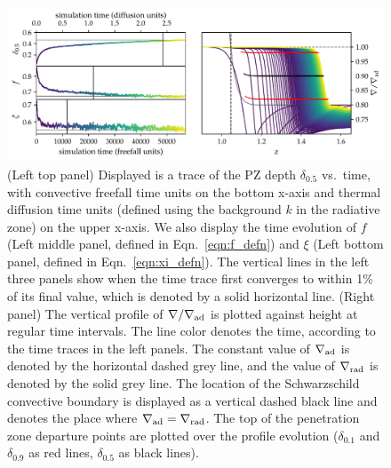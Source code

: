 \documentclass[twocolumn]{aastex631}
\newcommand{\gradrad}{\ensuremath{\nabla_{\rm{rad}}}}
\newcommand{\gradad}{\ensuremath{\nabla_{\rm{ad}}}}
\newcommand{\justgrad}{\ensuremath{\nabla}}
\begin{document}
\begin{figure}[t!]
\centering
\includegraphics[width=\textwidth]{time_evolution.pdf}
\caption{
(Left top panel) Displayed is a trace of the PZ depth $\delta_{0.5}$ vs.~time, with convective freefall time units on the bottom x-axis and thermal diffusion time units (defined using the background $k$ in the radiative zone) on the upper x-axis.
We also display the time evolution of $f$ (Left middle panel, defined in Eqn.~\ref{eqn:f_defn}) and $\xi$ (Left bottom panel, defined in Eqn.~\ref{eqn:xi_defn}).
The vertical lines in the left three panels show when the time trace first converges to within 1\% of its final value, which is denoted by a solid horizontal line.
(Right panel) The vertical profile of $\justgrad/\gradad$ is plotted against height at regular time intervals.
The line color denotes the time, according to the time traces in the left panels.
The constant value of $\gradad$ is denoted by the horizontal dashed grey line, and the value of $\gradrad$ is denoted by the solid grey line.
The location of the Schwarzschild convective boundary is displayed as a vertical dashed black line and denotes the place where $\gradad = \gradrad$.
The top of the penetration zone departure points are plotted over the profile evolution ($\delta_{0.1}$ and $\delta_{0.9}$ as red lines, $\delta_{0.5}$ as black lines).
\label{fig:time_evolution}
}
\end{figure}
\end{document}
